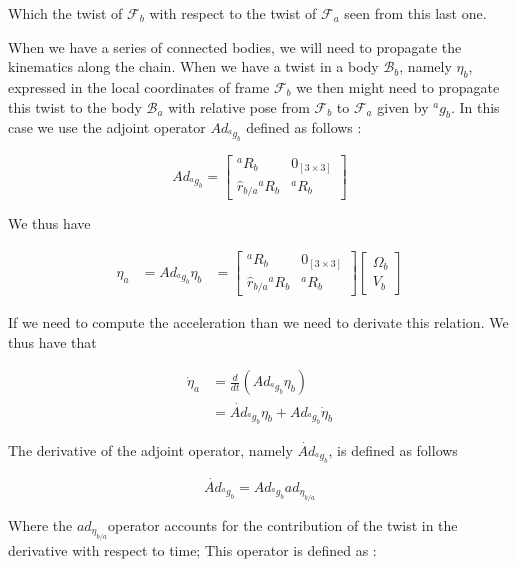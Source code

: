 \documentclass[12pt,a4paper]{book}
\newcommand{\Fa}{\ensuremath{\mathcal{F}_a}}
\newcommand{\Fb}{\ensuremath{\mathcal{F}_b}}
\newcommand{\Ba}{\ensuremath{\mathcal{B}_a}}
\newcommand{\Bb}{\ensuremath{\mathcal{B}_b}}
\newcommand{\agb}{\ensuremath{{^a g _b}}}
\newcommand{\aRb}{\ensuremath{{^a R _b}}}
\newcommand{\hatrba}{\ensuremath{{\hat{r}_{b/a}}}}
\newcommand{\etaa}{\ensuremath{{\eta_{a}}}}
\newcommand{\etab}{\ensuremath{{\eta_{b}}}}
\newcommand{\etaba}{\ensuremath{{\eta_{b/a}}}}
\newcommand{\dotetaa}{\ensuremath{{\dot{\eta}_{a}}}}
\newcommand{\dotetab}{\ensuremath{{\dot{\eta}_{b}}}}
\newcommand{\Adagb}{\ensuremath{Ad_{\agb}}}
\newcommand{\dotAdagb}{\ensuremath{\dot{Ad}_{\agb}}}
\newcommand{\adetaba}{\ensuremath{ad_{\etaba}}}
\begin{document}
Which the twist of \Fb{} with respect to the twist of \Fa{} seen from this last one.

When we have a series of connected bodies, we will need to propagate the kinematics along the chain. When we have a twist in a body \Bb{}, namely \etab{}, expressed in the local coordinates of frame \Fb{} we then might need to propagate this twist to the body \Ba{} with relative pose from \Fb{} to \Fa{} given by \agb{}. In this case we use the adjoint operator \Adagb{} defined as follows :


\begin{equation}
	\Adagb = 
	\begin{bmatrix}
		\aRb	&	0_{[3\times 3]}	\\
		\hatrba \aRb	&	\aRb
	\end{bmatrix}
\end{equation}

We thus have 

\begin{equation}
\begin{aligned}
	\etaa 	&= \Adagb \etab
			&=
			\begin{bmatrix}
				\aRb	&	0_{[3\times 3]}	\\
				\hatrba \aRb	&	\aRb
			\end{bmatrix}
			\begin{bmatrix}
				\Omega_b	\\
				V_b
			\end{bmatrix}
\end{aligned}
\end{equation}


If we need to compute the acceleration than we need to derivate this relation. We thus have that 

\begin{equation}
\begin{aligned}
	\dotetaa 	&= \frac{d}{dt}\left( \Adagb \etab \right) \\
				&= \dotAdagb \etab + \Adagb \dotetab
\end{aligned}
\end{equation}

The derivative of the adjoint operator, namely \dotAdagb{}, is defined as follows

\begin{equation}\label{eq:derivative Ad time}
	\dotAdagb = \Adagb \adetaba
\end{equation}

Where the \adetaba operator accounts for the contribution of the twist in the derivative with respect to time; This operator is defined as :
\end{document}
